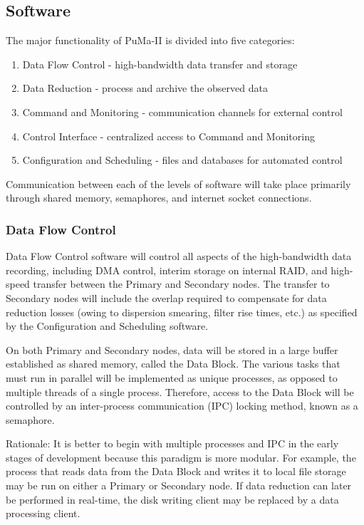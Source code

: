 \subsection{Software}

The major functionality of PuMa-II is divided into five categories:

\begin{enumerate}

\item Data Flow Control - high-bandwidth data transfer and storage
\item Data Reduction - process and archive the observed data
\item Command and Monitoring - communication channels for external control
\item Control Interface - centralized access to Command and Monitoring
\item Configuration and Scheduling - files and databases for automated control

\end{enumerate}

Communication between each of the levels of software will take place
primarily through shared memory, semaphores, and internet socket
connections.

\subsubsection{Data Flow Control}

Data Flow Control software will control all aspects of the
high-bandwidth data recording, including DMA control, interim storage
on internal RAID, and high-speed transfer between the Primary and
Secondary nodes.  The transfer to Secondary nodes will include the
overlap required to compensate for data reduction losses (owing to
dispersion smearing, filter rise times, etc.) as specified by the
Configuration and Scheduling software.

On both Primary and Secondary nodes, data will be stored in a large
buffer established as shared memory, called the Data Block.  The
various tasks that must run in parallel will be implemented as unique
processes, as opposed to multiple threads of a single process.
Therefore, access to the Data Block will be controlled by an
inter-process communication (IPC) locking method, known as a
semaphore.

Rationale: It is better to begin with multiple processes and IPC in the
early stages of development because this paradigm is more modular.
For example, the process that reads data from the Data Block and
writes it to local file storage may be run on either a Primary or
Secondary node.  If data reduction can later be performed in
real-time, the disk writing client may be replaced by a data
processing client.

